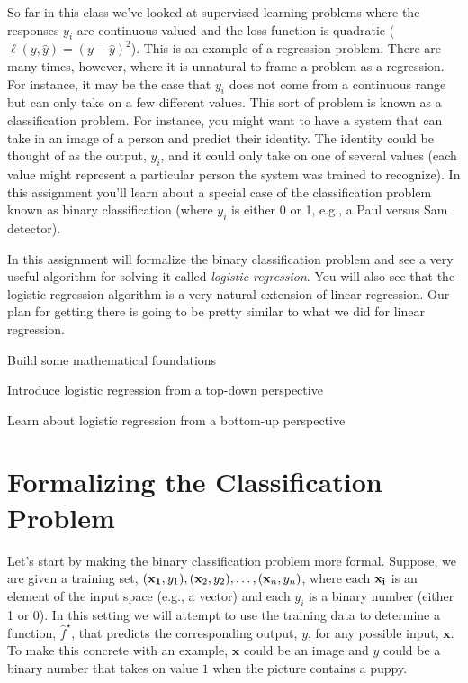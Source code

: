 \documentclass[assignment03_Solutions]{subfiles}
\begin{document}
So far in this class we've looked at supervised learning problems where the responses $y_i$ are continuous-valued and the loss function is quadratic ($\ell(y, \hat{y}) = (y-\hat{y})^2$).  This is an example of a regression problem.  There are many times, however, where it is unnatural to frame a problem as a regression.  For instance, it may be the case that $y_i$ does not come from a continuous range but can only take on a few different values.  This sort of problem is known as a classification problem.  For instance, you might want to have a system that can take in an image of a person and predict their identity.  The identity could be thought of as the output, $y_i$, and it could only take on one of several values (each value might represent a particular person the system was trained to recognize).  In this assignment you'll learn about a special case of the classification problem known as binary classification (where $y_i$ is either 0 or 1, e.g., a Paul versus Sam detector).

In this assignment will formalize the binary classification problem and see a very useful algorithm for solving it called \emph{logistic regression}.  You will also see that the logistic regression algorithm is a very natural extension of linear regression.  Our plan for getting there is going to be pretty similar to what we did for linear regression.
\bi
\item Build some mathematical foundations
\item Introduce logistic regression from a top-down perspective
\item Learn about logistic regression from a bottom-up perspective
\ei

\section{Formalizing the Classification Problem}
Let's start by making the binary classification problem more formal.  Suppose, we are given a training set, $(\mathbf{x_1}, y_1), (\mathbf{x}_2, y_2), \ldots, (\mathbf{x}_n, y_n)$, where each $\mathbf{x_i}$ is an element of the input space (e.g., a vector) and each $y_i$ is a binary number (either 1 or 0).  In this setting we will attempt to use the training data to determine a function, $\hat{f}^\star$, that predicts the corresponding output, $y$, for any possible input, $\mathbf{x}$.  To make this concrete with an example,  $\mathbf{x}$ could be an image and $y$ could be a binary number that takes on value $1$ when the picture contains a puppy.
\end{document}
